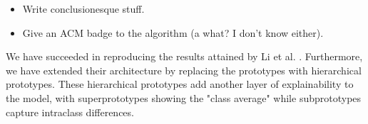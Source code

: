 \begin{itemize}
    \item Write conclusionesque stuff.
    \item Give an ACM badge to the algorithm (a what? I don't know either).
\end{itemize}

We have succeeded in reproducing the results attained by Li et al. \citep{li2018deep}. Furthermore, we have extended their architecture by replacing the prototypes with hierarchical prototypes. These hierarchical prototypes add another layer of explainability to the model, with superprototypes showing the "class average" while subprototypes capture intraclass differences. 

